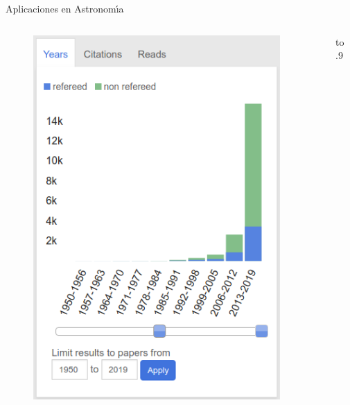 \documentclass[11pt]{beamer}
\begin{document}
\begin{frame}{Aplicaciones en Astronom\'{\i}a}
	\begin{columns}
	\begin{column}{0.3\textwidth}
	\begin{figure}
	    \centering
	    \includegraphics[width=0.95\textwidth]{images/citas_ml_astro.png}
	\end{figure}
	\end{column}
	\begin{column}{0.7\textwidth}
	\vbox to .9
\end{column}
\end{columns}
\end{frame}
\end{document}
